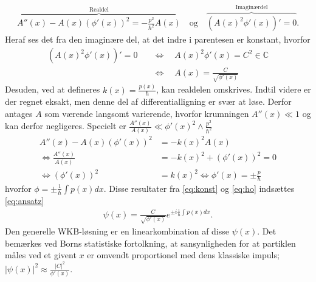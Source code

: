 \begin{align}
    \overbrace{A''(x) - A(x)\left( \phi'(x) \right)^{2} = - \frac{p^{2}}{\hbar^{2}}A(x)}^{\text{Realdel}} \quad \text{og} \quad%
    \overbrace{\left( A(x)^{2}\phi'(x) \right)' = 0}^{\text{Imaginærdel}}.
    \label{eq:realogimag}
\end{align}
Heraf ses det fra den imaginære del, at det indre i parentesen er konstant, hvorfor
\begin{align}
    \left( A(x)^{2}\phi'(x) \right)' = 0  \quad & \Leftrightarrow  \quad A(x)^{2}\phi'(x) = C^{2} \in \mathbb{C} \\
    & \Leftrightarrow  \quad A(x) = \frac{C}{\sqrt{\phi'(x)}}
    \label{eq:konst}
\end{align}
Desuden, ved at defineres $k(x) = \frac{p(x)}{\hbar}$, kan realdelen omskrives. Indtil videre er der regnet eksakt, men denne del af differentialligning er svær at løse. Derfor antages $A$ som værende langsomt varierende, hvorfor krumningen $A''(x)\ll 1$ og kan derfor negligeres. Specielt er $\frac{A''(x)}{A(x)} \ll \phi'(x)^{2}\wedge \frac{p^{2}}{\hbar^{2}}$
\begin{align}
    A''(x) - A(x)(\phi'(x))^{2} & =  -k(x)^{2}A(x)\\
    \Leftrightarrow \frac{A''(x)}{A(x)} & = -k(x)^{2} + (\phi'(x))^{2} = 0 \\
    \Leftrightarrow \left(\phi'(x)\right)^{2} & = k(x)^{2} \Leftrightarrow  \phi'(x) = \pm \frac{p}{\hbar}
    \label{eq:ho}
\end{align}
hvorfor $\phi = \pm \frac{1}{\hbar}\int p(x) dx$. Disse resultater fra \cref{eq:konst} og \cref{eq:ho} indsættes \cref{eq:ansatz}
\begin{align}
    \psi(x) = \frac{C}{\sqrt{\phi'(x)}}e^{\pm i\frac{1}{\hbar}\int p(x) dx}.
    \label{eqpsi}
\end{align}
Den generelle WKB-løsning er en linearkombination af disse $\psi(x)$. Det bemærkes ved Borns statistiske fortolkning, at sansynligheden for at partiklen måles ved et givent $x$ er omvendt proportionel med dens klassiske impuls; $|\psi(x)|^2 \approx \frac{|C|^2}{\phi'(x)}$.


